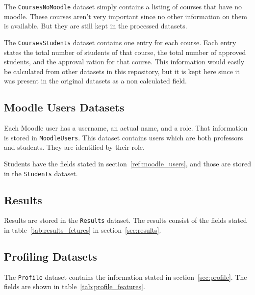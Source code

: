 The \texttt{CoursesNoMoodle} dataset simply contains a listing of courses that
have no moodle. These courses aren't very important since no other information
on them is available. But they are still kept in the processed datasets.

The \texttt{CoursesStudents} dataset contains one entry for each course. Each
entry states the total number of students of that course, the total number of
approved students, and the approval ration for that course. This information
would easily be calculated from other datasets in this repository, but it is
kept here since it was present in the original datasets as a non calculated
field.

\subsection{Moodle Users Datasets}

Each Moodle user has a username, an actual name, and a role. That information
is stored in \texttt{MoodleUsers}. This dataset contains users which are both
professors and students. They are identified by their role.

Students have the fields stated in section~\ref{ref:moodle_users}, and those
are stored in the \texttt{Students} dataset.

\subsection{Results}

Results are stored in the \texttt{Results} dataset. The results consist of the
fields stated in table~\ref{tab:results_fetures} in section~\ref{sec:results}.

\subsection{Profiling Datasets}

The \texttt{Profile} dataset contains the information stated in
section~\ref{sec:profile}. The fields are shown in
table~\ref{tab:profile_features}.

